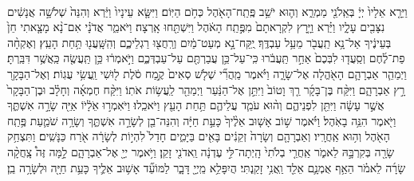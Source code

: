 \documentclass[twoside, openany, parskip=half, 11pt]{book}
\begin{document}
\begin{footnotesize}
\begin{multicols}{2}
\\
 וַיֵּרָ֤א אֵלָיו֙ יְיָ֔ בְּאֵֽלֹנֵ֖י מַמְרֵ֑א וְה֛וּא יֹשֵׁ֥ב פֶּֽתַֽח־הָאֹ֖הֶל כְּחֹ֥ם הַיּֽוֹם׃ וַיִּשָּׂ֤א עֵינָיו֙ וַיַּ֔רְא וְהִנֵּה֙ שְׁלֹשָׁ֣ה אֲנָשִׁ֔ים נִצָּבִ֖ים עָלָ֑יו וַיַּ֗רְא וַיָּ֤רָץ לִקְרָאתָם֙ מִפֶּ֣תַֽח הָאֹ֔הֶל וַיִּשְׁתַּ֖חוּ אָֽרְצָה׃ וַיֹּאמַ֑ר אֲדֹנָ֗י אִם־נָ֨א מָצָ֤אתִי חֵן֙ בְּעֵינֶ֔יךָ אַל־נָ֥א תַֽעֲבֹ֖ר מֵעַ֥ל עַבְדֶּֽךָ׃ 
 יֻֽקַּח־נָ֣א מְעַט־מַ֔יִם וְרַֽחֲצ֖וּ רַגְלֵיכֶ֑ם וְהִֽשָּֽׁעֲנ֖וּ תַּ֥חַת הָעֵֽץ׃ וְאֶקְחָ֨ה פַת־לֶ֜חֶם וְסַֽעֲד֤וּ לִבְּכֶם֙ אַחַ֣ר תַּֽעֲבֹ֔רוּ כִּֽי־עַל־כֵּ֥ן עֲבַרְתֶּ֖ם עַל־עַבְדְּכֶ֑ם וַיֹּ֣אמְר֔וּ כֵּ֥ן תַּֽעֲשֶׂ֖ה כַּֽאֲשֶׁ֥ר דִּבַּֽרְתָּ׃
 וַיְמַהֵ֧ר אַבְרָהָ֛ם הָאֹ֖הֱלָה אֶל־שָׂרָ֑ה וַיֹּ֗אמֶר מַֽהֲרִ֞י שְׁלֹ֤שׁ סְאִים֙ קֶ֣מַח סֹ֔לֶת ל֖וּשִׁי וַֽעֲשִׂ֥י עֻגֽוֹת׃ וְאֶל־הַבָּקָ֖ר רָ֣ץ אַבְרָהָ֑ם וַיִּקַּ֨ח בֶּן־בָּקָ֜ר רַ֤ךְ וָטוֹב֙ וַיִּתֵּ֣ן אֶל־הַנַּ֔עַר וַיְמַהֵ֖ר לַֽעֲשׂ֥וֹת אֹתֽוֹ׃ וַיִּקַּ֨ח חֶמְאָ֜ה וְחָלָ֗ב וּבֶן־הַבָּקָר֙ אֲשֶׁ֣ר עָשָׂ֔ה וַיִּתֵּ֖ן לִפְנֵיהֶ֑ם וְה֨וּא עֹמֵ֧ד עֲלֵיהֶ֛ם תַּ֥חַת הָעֵ֖ץ וַיֹּאכֵֽלוּ׃  וַיֹּאֽמְר֣וּ אֵֹלָ֔יֹוֹ אַיֵּ֖ה שָׂרָ֣ה אִשְׁתֶּ֑ךָ וַיֹּ֖אמֶר הִנֵּ֥ה בָאֹֽהֶל׃ וַיֹּ֗אמֶר שׁ֣וֹב אָשׁ֤וּב אֵלֶ֨יךָ֙ כָּעֵ֣ת חַיָּ֔ה וְהִנֵּה־בֵ֖ן לְשָׂרָ֣ה אִשְׁתֶּ֑ךָ וְשָׂרָ֥ה שֹׁמַ֛עַת פֶּ֥תַֽח הָאֹ֖הֶל וְה֥וּא אַֽחֲרָֽיו׃ וְאַבְרָהָ֤ם וְשָׂרָה֙ זְקֵנִ֔ים בָּאִ֖ים בַּיָּמִ֑ים חָדַל֙ לִהְי֣וֹת לְשָׂרָ֔ה אֹ֖רַח כַּנָּשִֽׁים׃ וַתִּצְחַ֥ק שָׂרָ֖ה בְּקִרְבָּ֣הּ לֵאמֹ֑ר אַֽחֲרֵ֤י בְלֹתִי֙ הָֽיְתָה־לִּ֣י עֶדְנָ֔ה וַֽאדֹנִ֖י זָקֵֽן׃ וַיֹּ֥אמֶר יְיָ֖ אֶל־אַבְרָהָ֑ם לָ֣מָּה זֶּה֩ צָֽחֲקָ֨ה שָׂרָ֜ה לֵאמֹ֗ר הַאַ֥ף אֻמְנָ֛ם אֵלֵ֖ד וַֽאֲנִ֥י זָקַֽנְתִּי׃ הֲיִפָּלֵ֥א מֵֽיְיָ֖ דָּבָ֑ר לַמּוֹעֵ֞ד אָשׁ֥וּב אֵלֶ֛יךָ כָּעֵ֥ת חַיָּ֖ה וּלְשָׂרָ֥ה בֵֽן׃


\end{multicols}
\end{footnotesize}
\end{document}
